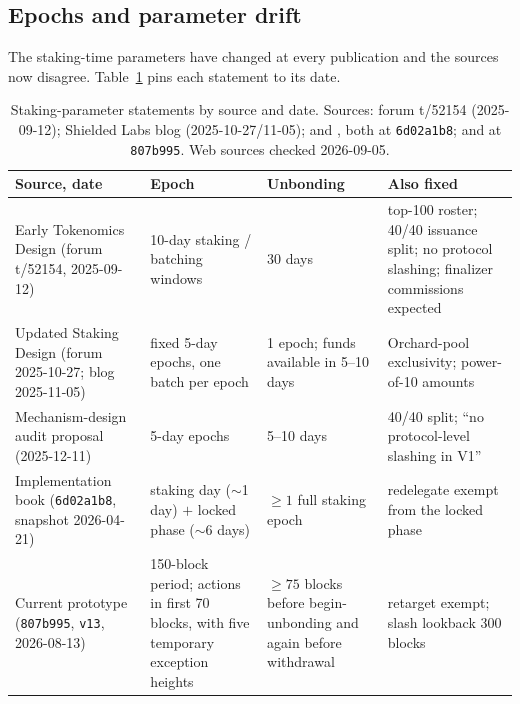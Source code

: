 \documentclass[11pt,a4paper]{article}
\theoremstyle{definition}
\begin{document}
\subsection{Epochs and parameter drift}\label{sec:xl-stake-params}

The staking-time parameters have changed at every publication and the
sources now disagree. Table~\ref{tab:xl-stake-params} pins each statement
to its date.

\begin{table}[htbp]
\centering
\small
\begin{tabular}{@{}p{3.6cm}p{3.6cm}p{2.9cm}p{4.1cm}@{}}
\toprule
Source, date & Epoch & Unbonding & Also fixed \\
\midrule
Early Tokenomics Design (forum t/52154, 2025-09-12)
  & 10-day staking / batching windows
  & 30 days
  & top-100 roster; 40/40 issuance split; no protocol slashing;
    finalizer commissions expected \\
Updated Staking Design (forum 2025-10-27; blog 2025-11-05)
  & fixed 5-day epochs, one batch per epoch
  & 1 epoch; funds available in 5--10 days
  & Orchard-pool exclusivity; power-of-10 amounts \\
Mechanism-design audit proposal (2025-12-11)
  & 5-day epochs
  & 5--10 days
  & 40/40 split; ``no protocol-level slashing in V1'' \\
Implementation book (\texttt{6d02a1b8}, snapshot 2026-04-21)
  & staking day ($\sim$1 day) $+$ locked phase ($\sim$6 days)
  & $\geq 1$ full staking epoch
  & redelegate exempt from the locked phase \\
Current prototype (\texttt{807b995}, \texttt{v13}, 2026-08-13)
  & 150-block period; actions in first 70 blocks, with five temporary
    exception heights
  & $\geq 75$ blocks before begin-unbonding and again before withdrawal
  & retarget exempt; slash lookback 300 blocks \\
\bottomrule
\end{tabular}
\caption{Staking-parameter statements by source and date. Sources:
forum t/52154 (2025-09-12); Shielded Labs blog (2025-10-27/11-05);
\protect{}
and \protect{}, both at \texttt{6d02a1b8};
\protect{} and
\protect{} at
\texttt{807b995}. Web sources checked 2026-09-05.}
\label{tab:xl-stake-params}
\end{table}
\end{document}
